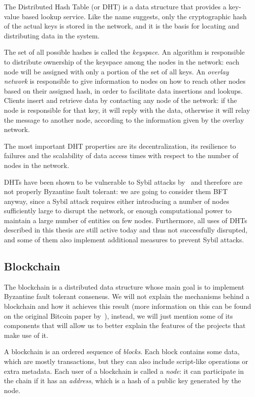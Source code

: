 \documentclass[mscthesis]{usiinfthesis}
\begin{document}
The Distributed Hash Table (or DHT) is a data structure that provides a key-value based lookup service. Like the name suggests, only the cryptographic hash of the actual keys is stored in the network, and it is the basis for locating and distributing data in the system.

The set of all possible hashes is called the \emph{keyspace}. An algorithm is responsible to distribute ownership of the keyspace among the nodes in the network: each node will be assigned with only a portion of the set of all keys. An \emph{overlay network} is responsible to give information to nodes on how to reach other nodes based on their assigned hash, in order to facilitate data insertions and lookups. Clients insert and retrieve data by contacting any node of the network: if the node is responsible for that key, it will reply with the data, otherwise it will relay the message to another node, according to the information given by the overlay network.

The most important DHT properties are its decentralization, its resilience to failures and the scalability of data access times with respect to the number of nodes in the network.

DHTs have been shown to be vulnerable to Sybil attacks by~\cite{wang2012real} and therefore are not properly Byzantine fault tolerant: we are going to consider them BFT anyway, since a Sybil attack requires either introducing a number of nodes sufficiently large to disrupt the network, or enough computational power to maintain a large number of entities on few nodes. Furthermore, all uses of DHTs described in this thesis are still active today and thus not successfully disrupted, and some of them also implement additional measures to prevent Sybil attacks.

\subsection{Blockchain}\label{tech:blockchain}

The blockchain is a distributed data structure whose main goal is to implement Byzantine fault tolerant consensus. We will not explain the mechanisms behind a blockchain and how it achieves this result (more information on this can be found on the original Bitcoin paper by~\cite{bitcoin}),
instead, we will just mention some of its components that will allow us to better explain the features of the projects that make use of it.

A blockchain is an ordered sequence of \emph{blocks}. Each block contains some data, which are mostly transactions, but they can also include script-like operations or extra metadata. Each user of a blockchain is called a \emph{node}: it can participate in the chain if it has an \emph{address}, which is a hash of a public key generated by the node.
\end{document}
